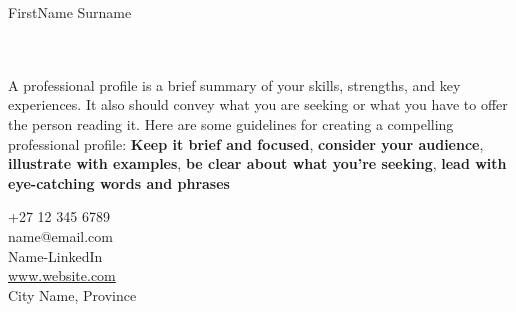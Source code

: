 \documentclass[12pt, a4paper, conference]{IEEEtran}
\begin{document}
\begin{minipage}{\textwidth}
{\fontsize{50}{1}\selectfont FirstName \color{orange}Surname}
\\
\end{minipage}
\noindent\makebox[\linewidth]{\rule{\paperwidth}{1pt}}

\begin{minipage}[t][5cm][t]{0.7\textwidth}
{}\\
\\
A professional profile is a brief summary of your skills, strengths, and key experiences. It also should convey what you are seeking or what you have to offer the person reading it. Here are some guidelines for creating a compelling professional profile: \textbf{Keep it brief and focused}, \textbf{consider your audience}, \textbf{illustrate with examples}, \textbf{be clear about what you're seeking}, \textbf{lead with eye-catching words and phrases} 
\end{minipage}
\quad
\vrule height 3ex width 1pt
\quad
\begin{minipage}[t][5cm][t]{0.2\textwidth}
+27 12 345 6789\\

name@email.com\\

Name-LinkedIn\\

\url{www.website.com}\\

City Name, Province
\end{minipage}

\noindent\makebox[\linewidth]{\rule{\paperwidth}{1pt}}
\end{document}
